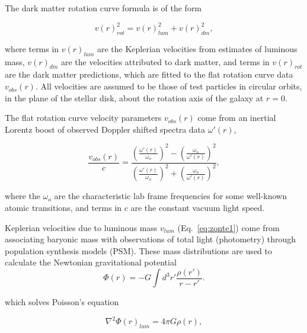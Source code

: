 \documentclass[reprint,%
 amsmath,amssymb,
 aps,
]{revtex4-1}
\begin{document}
  

 The   dark matter rotation curve formula   is of the form

 \begin{equation}
v(r)^2_{rot}  =  v(r)^2_{lum}  +  v(r)^2_{dm},   
\label{eq:zonte1}
\end{equation} 

  where terms in $v(r)_{lum}$ are the Keplerian velocities from estimates of   luminous mass,  $v(r)_{dm}$ are the velocities attributed to  dark matter, and 
  terms in $v(r)_{rot} $ are the dark matter  predictions,  which are fitted to the flat rotation curve data
  $v_{obs}(r)$. All velocities are assumed to be those of test particles in circular orbits, in the plane of the stellar disk,  about the rotation axis of the galaxy at  $r=0$. 
  

The flat rotation curve velocity parameters    $v_{obs}(r)$  come from an inertial 
 Lorentz boost  of  observed  Doppler shifted spectra data  $\omega'(r)$,  
   

 \begin{equation}
 \frac{v_{obs}(r) }{c}=
\frac{  \left( \frac{\omega'(r)}{\omega_o}\right)^2 -  \left( \frac{\omega_o}{\omega'(r)} \right)^2 }{  \left( \frac{\omega'(r)}{\omega_o}\right)^2  +  \left( \frac{\omega_o}{\omega'(r)}\right)^2 }, 
\label{eq:modelLumA}
\end{equation} 

  where the    $\omega_o$  are the
  characteristic lab  frame frequencies for some well-known atomic transitions, and terms in $c$ are  the constant vacuum light speed. 

  
  
  
  Keplerian velocities due to   luminous mass $v_{lum}$ (Eq.~\ref{eq:zonte1})
   come from associating  baryonic  mass with observations of total light  (photometry)  through  population synthesis models (PSM).  
  These mass distributions are    used to 
  calculate the Newtonian gravitational potential  
\begin{equation}
      \Phi(r)  = -G \int d^3r'  \frac{ \rho(r') }{r-r'}.
      \label{eq:Newt}
      \end{equation}
  
which solves Poisson's equation

\begin{equation}
\nabla^2 \Phi(r)_{lum}  = 4\pi G \rho(r),     
    \label{whatsgood}
\end{equation}
\end{document}
